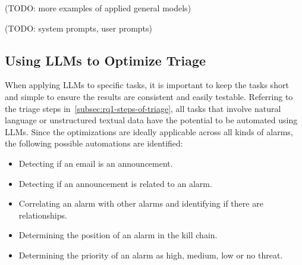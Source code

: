 (TODO: more examples of applied general models) %

(TODO: system prompts, user prompts) %

\subsection{Using LLMs to Optimize Triage}
\label{subsec:rq1-llms-in-context}

When applying LLMs to specific tasks, it is important to keep the tasks short and simple to ensure the results are
consistent and easily testable.
Referring to the triage steps in\ \ref{subsec:rq1-steps-of-triage}, all tasks that involve natural language or
unstructured textual data have the potential to be automated using LLMs.
Since the optimizations are ideally applicable across all kinds of alarms, the following possible automations are
identified:
\begin{itemize}
    \item Detecting if an email is an announcement.
    \item Detecting if an announcement is related to an alarm.
    \item Correlating an alarm with other alarms and identifying if there are relationships.
    \item Determining the position of an alarm in the kill chain.
    \item Determining the priority of an alarm as high, medium, low or no threat.
\end{itemize}
